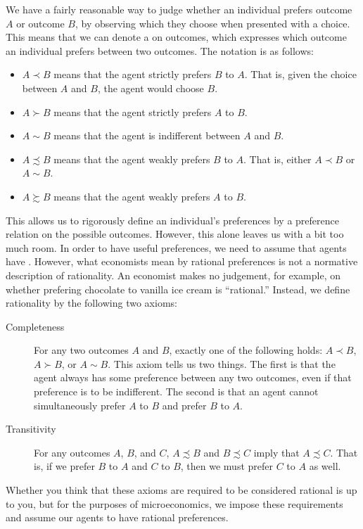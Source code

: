 We have a fairly reasonable way to judge whether an individual prefers outcome $A$ or outcome $B$, by observing which they choose when presented with a choice. This means that we can denote a  on outcomes, which expresses which outcome an individual prefers between two outcomes. The notation is as follows:
\begin{itemize}
    \item $A \prec B$ means that the agent strictly prefers $B$ to $A$. That is, given the choice between $A$ and $B$, the agent would choose $B$.
    \item $A \succ B$ means that the agent strictly prefers $A$ to $B$.
    \item $A \sim B$ means that the agent is indifferent between $A$ and $B$.
    \item $A \precsim B$ means that the agent weakly prefers $B$ to $A$. That is, either $A \prec B$ or $A \sim B$.
    \item $A \succsim B$ means that the agent weakly prefers $A$ to $B$.
\end{itemize}
This allows us to rigorously define an individual's preferences by a preference relation on the possible outcomes. However, this alone leaves us with a bit too much room. In order to have useful preferences, we need to assume that agents have . However, what economists mean by rational preferences is not a normative description of rationality. An economist makes no judgement, for example, on whether prefering chocolate to vanilla ice cream is ``rational.'' Instead, we define rationality by the following two axioms:
\begin{description}
    \item[Completeness] For any two outcomes $A$ and $B$, exactly one of the following holds: $A \prec B$, $A \succ B$, or $A \sim B$. This axiom tells us two things. The first is that the agent always has some preference between any two outcomes, even if that preference is to be indifferent. The second is that an agent cannot simultaneously prefer $A$ to $B$ and prefer $B$ to $A$.
    \item[Transitivity] For any outcomes $A$, $B$, and $C$, $A \precsim B$ and $B \precsim C$ imply that $A \precsim C$. That is, if we prefer $B$ to $A$ and $C$ to $B$, then we must prefer $C$ to $A$ as well.
\end{description}
Whether you think that these axioms are required to be considered rational is up to you, but for the purposes of microeconomics, we impose these requirements and assume our agents to have rational preferences.

